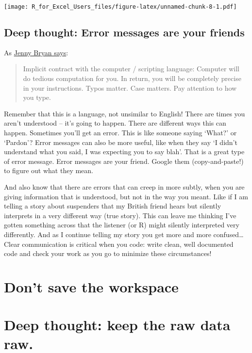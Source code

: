 \documentclass[]{book}
\begin{document}
\texttt{[image: R\_for\_Excel\_Users\_files/figure-latex/unnamed-chunk-8-1.pdf]}

\hypertarget{deep-thought-error-messages-are-your-friends}{%
\subsection{Deep thought: Error messages are your friends}\label{deep-thought-error-messages-are-your-friends}}

As \href{https://stat545.com/r-basics.html}{Jenny Bryan says}:

\begin{quote}
Implicit contract with the computer / scripting language: Computer will do tedious computation for you. In return, you will be completely precise in your instructions. Typos matter. Case matters. Pay attention to how you type.
\end{quote}

Remember that this is a language, not unsimilar to English! There are times you aren't understood -- it's going to happen. There are different ways this can happen. Sometimes you'll get an error. This is like someone saying `What?' or `Pardon'? Error messages can also be more useful, like when they say `I didn't understand what you said, I was expecting you to say blah'. That is a great type of error message. Error messages are your friend. Google them (copy-and-paste!) to figure out what they mean.

And also know that there are errors that can creep in more subtly, when you are giving information that is understood, but not in the way you meant. Like if I am telling a story about suspenders that my British friend hears but silently interprets in a very different way (true story). This can leave me thinking I've gotten something across that the listener (or R) might silently interpreted very differently. And as I continue telling my story you get more and more confused\ldots{} Clear communication is critical when you code: write clean, well documented code and check your work as you go to minimize these circumstances!

\hypertarget{dont-save-the-workspace}{%
\section{Don't save the workspace}\label{dont-save-the-workspace}}

\hypertarget{deep-thought-keep-the-raw-data-raw.}{%
\section{Deep thought: keep the raw data raw.}\label{deep-thought-keep-the-raw-data-raw.}}
\end{document}
